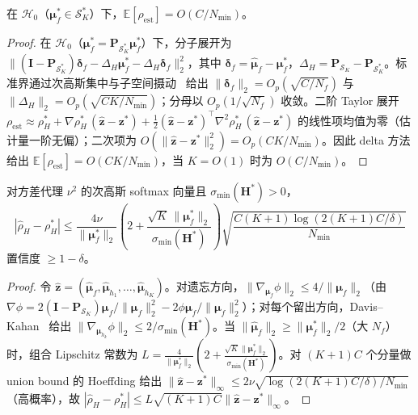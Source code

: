 \begin{proposition}[偏差--方差分解]
\label{prop:mhpr_bias}
在 $\mathcal{H}_0$（$\boldsymbol{\mu}_f^* \in \mathcal{S}_K^*$）下，$\mathbb{E}[\rho_{\mathrm{est}}] = O(C/N_{\min})$。
\end{proposition}
\begin{proof}
在 $\mathcal{H}_0$（$\boldsymbol{\mu}_f^*=\mathbf{P}_{\mathcal{S}_K^*}\boldsymbol{\mu}_f^*$）下，分子展开为 $\|(\mathbf{I}-\mathbf{P}_{\mathcal{S}_K^*})\boldsymbol{\delta}_f-\Delta_H\boldsymbol{\mu}_f^*-\Delta_H\boldsymbol{\delta}_f\|_2^2$，其中 $\boldsymbol{\delta}_f=\hat{\boldsymbol{\mu}}_f-\boldsymbol{\mu}_f^*$，$\Delta_H=\mathbf{P}_{\mathcal{S}_K}-\mathbf{P}_{\mathcal{S}_K^*}$。标准界通过次高斯集中与子空间摄动~\cite{stewart1990matrix} 给出 $\|\boldsymbol{\delta}_f\|_2=O_p(\sqrt{C/N_f})$ 与 $\|\Delta_H\|_2=O_p(\sqrt{CK/N_{\min}})$；分母以 $O_p(1/\sqrt{N_f})$ 收敛。二阶 Taylor 展开 $\rho_{\mathrm{est}}\approx\rho_H^*+\nabla\rho_H^*\,(\hat{\mathbf{z}}-\mathbf{z}^*)+\frac12(\hat{\mathbf{z}}-\mathbf{z}^*)^\top\nabla^2\rho_H^*\,(\hat{\mathbf{z}}-\mathbf{z}^*)$ 的线性项均值为零（估计量一阶无偏）；二次项为 $O(\|\hat{\mathbf{z}}-\mathbf{z}^*\|_2^2)=O_p(CK/N_{\min})$。因此 delta 方法给出 $\mathbb{E}[\rho_{\mathrm{est}}]=O(CK/N_{\min})$，当 $K=O(1)$ 时为 $O(C/N_{\min})$。
\end{proof}

\begin{proposition}[有限样本界]
\label{prop:mhpr_confidence}
对方差代理 $\nu^2$ 的次高斯 softmax 向量且 $\sigma_{\min}(\mathbf{H}^*)>0$，
\begin{equation}
|\hat{\rho}_H - \rho_H^*| \le \frac{4\nu}{\|\boldsymbol{\mu}_f^*\|_2}\left(2+\frac{\sqrt{K}\,\|\boldsymbol{\mu}_f^*\|_2}{\sigma_{\min}(\mathbf{H}^*)}\right)\sqrt{\frac{C(K+1)\log(2(K+1)C/\delta)}{N_{\min}}}
\end{equation}
置信度 $\ge 1-\delta$。
\end{proposition}
\begin{proof}
令 $\hat{\mathbf{z}}=(\hat{\boldsymbol{\mu}}_f,\hat{\boldsymbol{\mu}}_{h_1},\dots,\hat{\boldsymbol{\mu}}_{h_K})$。对遗忘方向，$\|\nabla_{\boldsymbol{\mu}_f}\phi\|_2\le4/\|\boldsymbol{\mu}_f\|_2$（由 $\nabla\phi=2(\mathbf{I}-\mathbf{P}_{\mathcal{S}_K})\boldsymbol{\mu}_f/\|\boldsymbol{\mu}_f\|_2^2-2\phi\boldsymbol{\mu}_f/\|\boldsymbol{\mu}_f\|_2^2$）；对每个留出方向，Davis--Kahan~\cite{stewart1990matrix} 给出 $\|\nabla_{\boldsymbol{\mu}_{h_k}}\phi\|_2\le2/\sigma_{\min}(\mathbf{H}^*)$。当 $\|\hat{\boldsymbol{\mu}}_f\|_2\ge\|\boldsymbol{\mu}_f^*\|_2/2$（大 $N_f$）时，组合 Lipschitz 常数为 $L=\frac{4}{\|\boldsymbol{\mu}_f^*\|_2}(2+\frac{\sqrt{K}\|\boldsymbol{\mu}_f^*\|_2}{\sigma_{\min}(\mathbf{H}^*)})$。对 $(K+1)C$ 个分量做 union bound 的 Hoeffding 给出 $\|\hat{\mathbf{z}}-\mathbf{z}^*\|_\infty\le2\nu\sqrt{\log(2(K+1)C/\delta)/N_{\min}}$（高概率），故 $|\hat{\rho}_H-\rho_H^*|\le L\sqrt{(K+1)C}\|\hat{\mathbf{z}}-\mathbf{z}^*\|_\infty$。
\end{proof}

